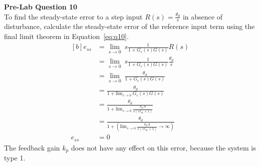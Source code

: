 \documentclass[12pt]{article}
\begin{document}
\textbf{Pre-Lab Question 10} \\
To find the steady-state error to a step input $R(s) = \frac{\theta_d}{s}$ in absence of disturbance, calculate the steady-state error of the reference input term using the final limit theorem in Equation~\ref{eq:q10}.
\begin{equation} \label{eq:q10}
\begin{aligned}[b]
    e_{ss} &= \lim_{s \to 0} \ s \frac{1}{1 + G_c(s)G(s)} R(s) \\
    &= \lim_{s \to 0} \ s \frac{1}{1 + G_c(s)G(s)} \frac{\theta_d}{s} \\
    &= \lim_{s \to 0} \ \frac{\theta_d}{1 + G_c(s)G(s)} \\
    &= \frac{\theta_d}{1 + \text{lim}_{s \to 0} \ G_c(s)G(s)} \\
    &= \frac{\theta_d}{1 + \text{lim}_{s \to 0} \ \frac{k_pA}{s(s\tau_m + 1)}} \\
    &= \frac{\theta_d}{1 + (\text{lim}_{s \to 0} \ \frac{k_pA}{s(s\tau_m + 1)}\to \infty)} \\
    e_{ss} &= 0
\end{aligned}
\end{equation}
The feedback gain $k_p$ does not have any effect on this error, because the system is type 1.
\end{document}
